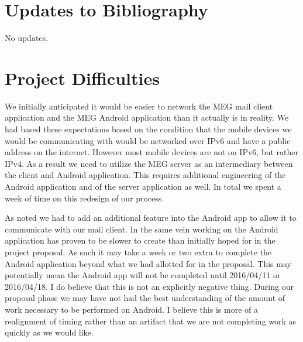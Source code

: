 \documentclass{article}
\begin{document}
\section{Updates to Bibliography}
No updates.

\section{Project Difficulties}
\par We initially anticipated it would be easier to network the MEG mail client application and the MEG Android application than it actually is in reality. We had based these expectations based on the condition that the mobile devices we would be communicating with would be networked over IPv6 and have a public address on the internet. However most mobile devices are not on IPv6, but rather IPv4. As a result we need to utilize the MEG server as an intermediary between the client and Android application. This requires additional engineering of the Android application and of the server application as well. In total we spent a week of time on this redesign of our process.
\par As noted we had to add an additional feature into the Android app to allow it to communicate with our mail client. In the same vein working on the Android application has proven to be slower to create than initially hoped for in the project proposal. As such it may take a week or two extra to complete the Android application beyond what we had allotted for in the proposal. This may potentially mean the Android app will not be completed until 2016/04/11 or 2016/04/18. I do believe that this is not an explicitly negative thing. During our proposal phase we may have not had the best understanding of the amount of work necessary to be performed on Android. I believe this is more of a realignment of timing rather than an artifact that we are not completing work as quickly as we would like.
\end{document}

